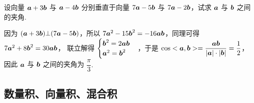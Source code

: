 \begin{example}
    设向量 $\vb*{a}+3\vb*{b}$ 与 $\vb*{a}-4\vb*{b}$ 分别垂直于向量 $7\vb*{a}-5\vb*{b}$ 与 $7\vb*{a}-2\vb*{b}$，试求 $\vb*{a}$ 与 $\vb*{b}$ 之间的夹角.
\end{example}
\begin{solution}
    因为 $\qty(\vb*{a}+3\vb*{b})\bot \qty(7\vb*{a}-5\vb*{b})$，所以 $7\vb*{a}^2-15\vb*{b}^2=-16\vb*{ab}$，同理可得 $7\vb*{a}^2+8\vb*{b}^2=30\vb*{ab}$，
    联立解得 $\begin{cases}
            \vb*{b}^2=2\vb*{ab} \\\vb*{a}^2=\vb*{b}^2
        \end{cases}$，于是 $\cos<\vb*{a},\vb*{b}>=\dfrac{\vb*{ab}}{|\vb*{a}|\cdot|\vb*{b}|}=\dfrac{1}{2}$，因此 $\vb*{a}$ 与 $\vb*{b}$ 之间的夹角为 $\dfrac{\pi}{3} .$
\end{solution}


\subsection{数量积、向量积、混合积}

